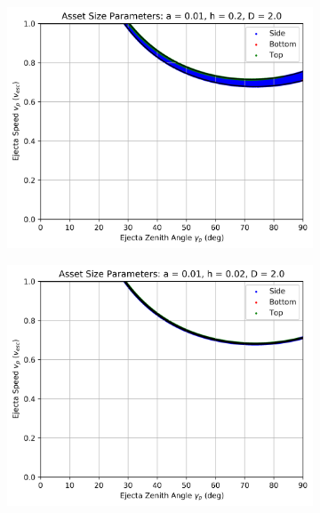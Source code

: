 \documentclass{article}
\begin{document}
\begin{figure}
	\begin{subfigure}[t]{.32\textwidth}
		\centering
		\includegraphics[width=.98\linewidth]{asset_speed_zenith_plot_1.010e+00_1.000e-02_2.000e-01_2.000e+00.png}  
		\label{fig:sub-asset_speed_zenith_h1_10}
	\end{subfigure}
	\begin{subfigure}[t]{.32\textwidth}
		\centering
		\includegraphics[width=.98\linewidth]{asset_speed_zenith_plot_1.010e+00_1.000e-02_2.000e-02_2.000e+00.png}  
		\label{fig:sub-asset_speed_zenith_h1_11}
	\end{subfigure}

\end{figure}
\end{document}
